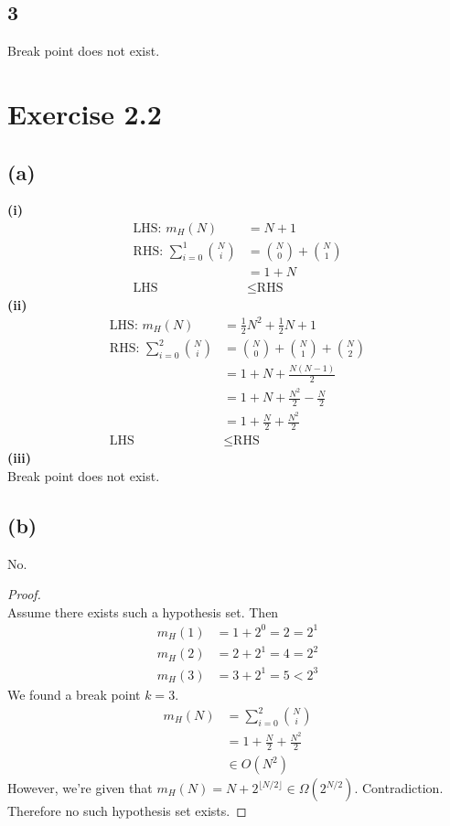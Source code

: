 \documentclass{article}
\begin{document}
	\subsection*{3}
		Break point does not exist.
		
	\section*{Exercise 2.2}
	\subsection*{(a)}
	\textbf{(i)}
		\begin{align*}
			\text{LHS: } m_H(N) &= N + 1\\
			\text{RHS: } \sum\limits_{i = 0}^1{N\choose i} &= {N \choose 0} + {N \choose 1}\\
			&= 1 + N\\
			\text{LHS} &\leq \text{RHS}
		\end{align*}
	\textbf{(ii)}
		\begin{align*}
			\text{LHS: } m_H(N) &= \frac12N^2 + \frac12N + 1\\
			\text{RHS: } \sum\limits_{i = 0}^2{N\choose i} &= {N \choose 0} + {N \choose 1} + {N \choose 2}\\
			&= 1 + N + \frac{N(N-1)}2\\
			&= 1 + N + \frac{N^2}2 - \frac N2\\
			&= 1 + \frac N2 + \frac{N^2}2\\
			\text{LHS} &\leq \text{RHS}
		\end{align*}
	\textbf{(iii)}\\
		Break point does not exist.
		
	\subsection*{(b)}
		No.
		\begin{proof}\ \\
			Assume there exists such a hypothesis set. Then
			\begin{align*}
				m_H(1) &= 1 + 2^0 = 2 = 2^1\\
				m_H(2) &= 2 + 2^1 = 4 = 2^2\\
				m_H(3) &= 3 + 2^1 = 5 < 2^3				
			\end{align*}
			We found a break point $k = 3$.
			\begin{align*}
				m_H(N) &= \sum\limits_{i = 0}^2{N\choose i}\\
				&= 1 + \frac N2 + \frac{N^2}2\\
				&\in O(N^2)\
			\end{align*}
			However, we're given that $m_H(N) = N + 2^{\lfloor N/2 \rfloor} \in \Omega(2^{N/2})$. Contradiction.\\
			Therefore no such hypothesis set exists.
		\end{proof}
		
\end{document}
